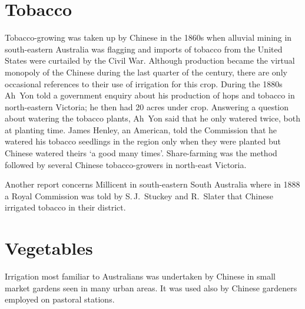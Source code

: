 \section*{Tobacco}

Tobacco-growing was taken up by Chinese  in the 1860s
when alluvial mining in south-eastern Australia was flagging and
imports of tobacco from the United States were curtailed by the Civil
War.  Although production became the virtual monopoly of the Chinese
during the last quarter of the century, there are only occasional
references to their use of irrigation for this crop.  During the 1880s
Ah~Yon  told a government enquiry about his production
of hops and tobacco in north-eastern Victoria; he then had 20 acres
under crop.  Answering a question about watering the tobacco plants,
Ah~Yon said that he only watered twice, both at planting time.  James
Henley,  an American, told the Commission that he
watered his tobacco seedlings in the region only when they were
planted but Chinese watered theirs `a good many times'.  Share-farming
was the method followed by several Chinese tobacco-growers in
north-east Victoria.

Another report concerns Millicent in south-eastern South Australia
where in 1888 a Royal Commission was told by S.\,J.~Stuckey
 and
R.~Slater  that Chinese irrigated tobacco in their
district.

\section*{Vegetables}

Irrigation most familiar to Australians was undertaken by Chinese
 in small market gardens seen in many urban areas.  It
was used also by Chinese gardeners employed on pastoral stations.

